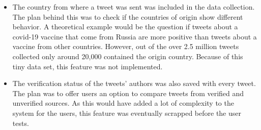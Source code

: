 \begin{itemize}
\begin{figure}[h!]
        \label{fig:sentiment_linechart}
    \end{figure}
    \item The country from where a tweet was sent was included in the data collection. The plan behind this was to check if the countries of origin show different behavior. A theoretical example would be the question if tweets about a covid-19 vaccine that come from Russia are more positive than tweets about a vaccine from other countries. However, out of the over 2.5 million tweets collected only around 20,000 contained the origin country. Because of this tiny data set, this feature was not implemented.
    \item The verification status of the tweets' authors was also saved with every tweet. The plan was to offer users an option to compare tweets from verified and unverified sources. As this would have added a lot of complexity to the system for the users, this feature was eventually scrapped before the user tests.
\end{itemize}

